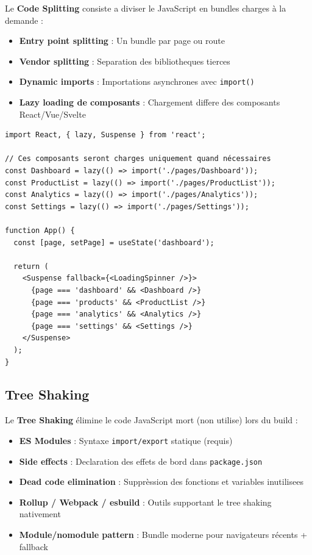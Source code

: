 \documentclass[12pt,a4paper,twoside]{report}
\newcommand{\keyword}[1]{\textbf{\textcolor{googleblue}{#1}}}
\begin{document}
Le \keyword{Code Splitting} consiste a diviser le JavaScript en bundles charges à la demande :

\begin{itemize}
    \item \textbf{Entry point splitting} : Un bundle par page ou route
    \item \textbf{Vendor splitting} : Separation des bibliotheques tierces
    \item \textbf{Dynamic imports} : Importations asynchrones avec \texttt{import()}
    \item \textbf{Lazy loading de composants} : Chargement differe des composants React/Vue/Svelte
\end{itemize}

\begin{lstlisting}[style=code,caption={Code Splitting avec React.lazy et Suspense}]
import React, { lazy, Suspense } from 'react';

// Ces composants seront charges uniquement quand nécessaires
const Dashboard = lazy(() => import('./pages/Dashboard'));
const ProductList = lazy(() => import('./pages/ProductList'));
const Analytics = lazy(() => import('./pages/Analytics'));
const Settings = lazy(() => import('./pages/Settings'));

function App() {
  const [page, setPage] = useState('dashboard');

  return (
    <Suspense fallback={<LoadingSpinner />}>
      {page === 'dashboard' && <Dashboard />}
      {page === 'products' && <ProductList />}
      {page === 'analytics' && <Analytics />}
      {page === 'settings' && <Settings />}
    </Suspense>
  );
}
\end{lstlisting}

\subsection{Tree Shaking}

Le \keyword{Tree Shaking} élimine le code JavaScript mort (non utilise) lors du build :

\begin{itemize}
    \item \textbf{ES Modules} : Syntaxe \texttt{import/export} statique (requis)
    \item \textbf{Side effects} : Declaration des effets de bord dans \texttt{package.json}
    \item \textbf{Dead code elimination} : Supprèssion des fonctions et variables inutilisees
    \item \textbf{Rollup / Webpack / esbuild} : Outils supportant le tree shaking nativement
    \item \textbf{Module/nomodule pattern} : Bundle moderne pour navigateurs récents + fallback
\end{itemize}
\end{document}
